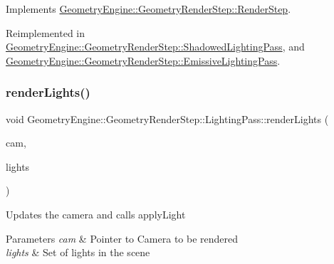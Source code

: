 Implements \mbox{\hyperlink{class_geometry_engine_1_1_geometry_render_step_1_1_render_step_a78676ad0b7b3fdfad5d1869f28426a83}{Geometry\+Engine\+::\+Geometry\+Render\+Step\+::\+Render\+Step}}.



Reimplemented in \mbox{\hyperlink{class_geometry_engine_1_1_geometry_render_step_1_1_shadowed_lighting_pass_ad188a4d3f33fb153459cf3483ff3df23}{Geometry\+Engine\+::\+Geometry\+Render\+Step\+::\+Shadowed\+Lighting\+Pass}}, and \mbox{\hyperlink{class_geometry_engine_1_1_geometry_render_step_1_1_emissive_lighting_pass_a03eb4da70618421703fc71d61669321d}{Geometry\+Engine\+::\+Geometry\+Render\+Step\+::\+Emissive\+Lighting\+Pass}}.

\mbox{\label{class_geometry_engine_1_1_geometry_render_step_1_1_lighting_pass_a437ff10a7ef9e7529a4852389a5cf871}} 
\subsubsection{\texorpdfstring{renderLights()}{renderLights()}}
{\footnotesize\ttfamily void Geometry\+Engine\+::\+Geometry\+Render\+Step\+::\+Lighting\+Pass\+::render\+Lights (\begin{DoxyParamCaption}\item[{\mbox{\hyperlink{class_geometry_engine_1_1_geometry_world_item_1_1_geometry_camera_1_1_camera}{Geometry\+World\+Item\+::\+Geometry\+Camera\+::\+Camera}} $\ast$}]{cam,  }\item[{std\+::unordered\+\_\+set$<$ \mbox{\hyperlink{class_geometry_engine_1_1_geometry_world_item_1_1_geometry_light_1_1_light}{Geometry\+World\+Item\+::\+Geometry\+Light\+::\+Light}} $\ast$ $>$ $\ast$}]{lights }\end{DoxyParamCaption})\hspace{0.3cm}{\ttfamily [protected]}}

Updates the camera and calls apply\+Light 
\begin{DoxyParams}{Parameters}
{\em cam} & Pointer to Camera to be rendered \\
\hline
{\em lights} & Set of lights in the scene \\
\hline
\end{DoxyParams}
\mbox{\label{class_geometry_engine_1_1_geometry_render_step_1_1_lighting_pass_a42b7f335d4bebdbdd06c3bef142844c0}} 
